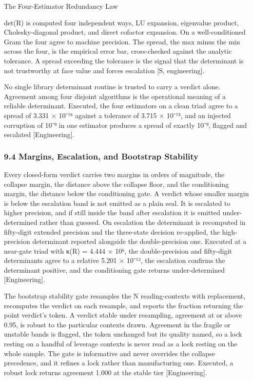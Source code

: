 \documentclass[10pt,twocolumn]{article}
\begin{document}
\begin{jbox}{The Four-Estimator Redundancy Law}

det(R) is computed four independent ways, LU expansion, eigenvalue
product, Cholesky-diagonal product, and direct cofactor expansion. On a
well-conditioned Gram the four agree to machine precision. The spread,
the max minus the min across the four, is the empirical error bar,
cross-checked against the analytic tolerance. A spread exceeding the
tolerance is the signal that the determinant is not trustworthy at face
value and forces escalation {[}S, engineering{]}.

\end{jbox}

No single library determinant routine is trusted to carry a verdict
alone. Agreement among four disjoint algorithms is the operational
meaning of a reliable determinant. Executed, the four estimators on a
clean triad agree to a spread of 3.331 × 10⁻¹⁶ against a tolerance of
3.715 × 10⁻¹⁵, and an injected corruption of 10⁻⁹ in one estimator
produces a spread of exactly 10⁻⁹, flagged and escalated
{[}Engineering{]}.

\hypertarget{margins-escalation-and-bootstrap-stability}{%
\subsubsection{9.4 Margins, Escalation, and Bootstrap
Stability}\label{margins-escalation-and-bootstrap-stability}}

Every closed-form verdict carries two margins in orders of magnitude,
the collapse margin, the distance above the collapse floor, and the
conditioning margin, the distance below the conditioning gate. A verdict
whose smaller margin is below the escalation band is not emitted as a
plain seal. It is escalated to higher precision, and if still inside the
band after escalation it is emitted under-determined rather than
guessed. On escalation the determinant is recomputed in fifty-digit
extended precision and the three-state decision re-applied, the
high-precision determinant reported alongside the double-precision one.
Executed at a near-gate triad with κ(R) = 4.444 × 10⁶, the
double-precision and fifty-digit determinants agree to a relative 5.201
× 10⁻¹², the escalation confirms the determinant positive, and the
conditioning gate returns under-determined {[}Engineering{]}.

The bootstrap stability gate resamples the N reading-contexts with
replacement, recomputes the verdict on each resample, and reports the
fraction returning the point verdict's token. A verdict stable under
resampling, agreement at or above 0.95, is robust to the particular
contexts drawn. Agreement in the fragile or unstable bands is flagged,
the token unchanged but its quality named, so a lock resting on a
handful of leverage contexts is never read as a lock resting on the
whole sample. The gate is informative and never overrides the collapse
precedence, and it refines a lock rather than manufacturing one.
Executed, a robust lock returns agreement 1.000 at the stable tier
{[}Engineering{]}.
\end{document}

